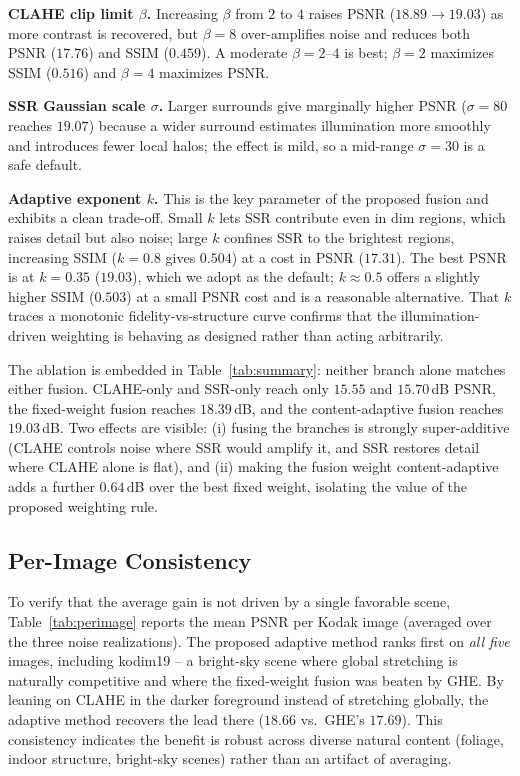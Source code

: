 \documentclass[conference,a4paper]{IEEEtran}
\begin{document}
\textbf{CLAHE clip limit $\beta$.} Increasing $\beta$ from $2$ to $4$ raises
PSNR ($18.89\rightarrow19.03$) as more contrast is recovered, but $\beta=8$
over-amplifies noise and reduces both PSNR ($17.76$) and SSIM ($0.459$). A
moderate $\beta=2$--$4$ is best; $\beta=2$ maximizes SSIM ($0.516$) and
$\beta=4$ maximizes PSNR.

\textbf{SSR Gaussian scale $\sigma$.} Larger surrounds give marginally higher
PSNR ($\sigma=80$ reaches $19.07$) because a wider surround estimates
illumination more smoothly and introduces fewer local halos; the effect is
mild, so a mid-range $\sigma=30$ is a safe default.

\textbf{Adaptive exponent $k$.} This is the key parameter of the proposed
fusion and exhibits a clean trade-off. Small $k$ lets SSR contribute even in
dim regions, which raises detail but also noise; large $k$ confines SSR to the
brightest regions, increasing SSIM ($k=0.8$ gives $0.504$) at a cost in PSNR
($17.31$). The best PSNR is at $k=0.35$ ($19.03$), which we adopt as the
default; $k\approx0.5$ offers a slightly higher SSIM ($0.503$) at a small PSNR
cost and is a reasonable alternative. That $k$ traces a monotonic
fidelity-vs-structure curve confirms that the illumination-driven weighting is
behaving as designed rather than acting arbitrarily.

The ablation is embedded in Table~\ref{tab:summary}: neither branch alone
matches either fusion. CLAHE-only and SSR-only reach only $15.55$ and
$15.70$\,dB PSNR, the fixed-weight fusion reaches $18.39$\,dB, and the
content-adaptive fusion reaches $19.03$\,dB. Two effects are visible: (i) fusing
the branches is strongly super-additive (CLAHE controls noise where SSR would
amplify it, and SSR restores detail where CLAHE alone is flat), and (ii) making
the fusion weight content-adaptive adds a further $0.64$\,dB over the best fixed
weight, isolating the value of the proposed weighting rule.

\subsection{Per-Image Consistency}
To verify that the average gain is not driven by a single favorable scene,
Table~\ref{tab:perimage} reports the mean PSNR per Kodak image (averaged over
the three noise realizations). The proposed adaptive method ranks first on
\emph{all five} images, including kodim19 -- a bright-sky scene where global
stretching is naturally competitive and where the fixed-weight fusion was beaten
by GHE. By leaning on CLAHE in the darker foreground instead of stretching
globally, the adaptive method recovers the lead there ($18.66$ vs.\ GHE's
$17.69$). This consistency indicates the benefit is robust across diverse
natural content (foliage, indoor structure, bright-sky scenes) rather than an
artifact of averaging.
\end{document}
